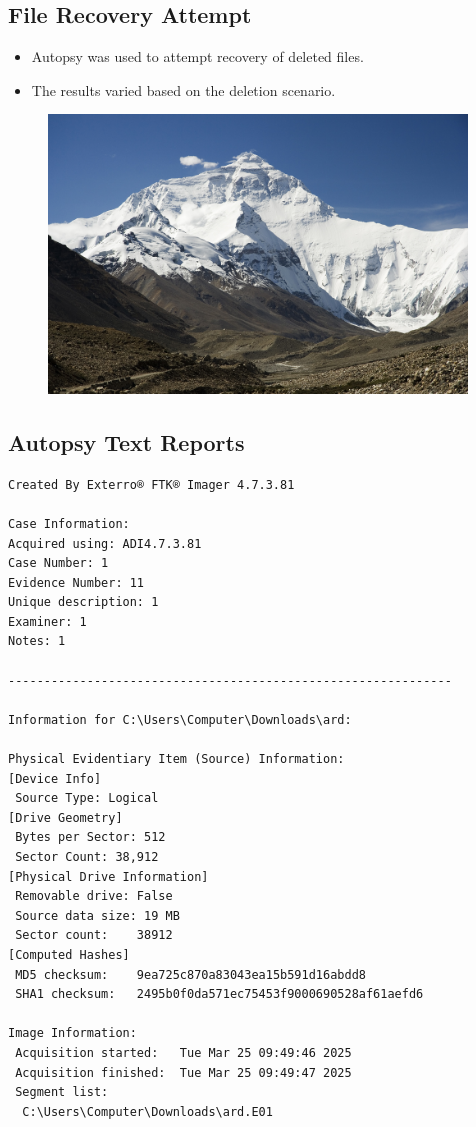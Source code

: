 \documentclass[11pt]{article}
\begin{document}
\subsection{File Recovery Attempt}
\begin{itemize}
    \item Autopsy was used to attempt recovery of deleted files.
    \item The results varied based on the deletion scenario.
\end{itemize}
\begin{figure}[H]
    \centering
    \includegraphics[width=0.99\textwidth]{everest.jpg}
    \caption{}
    \label{fig:1}
\end{figure}

\subsection{Autopsy Text Reports}

\begin{verbatim}
Created By Exterro® FTK® Imager 4.7.3.81 

Case Information: 
Acquired using: ADI4.7.3.81
Case Number: 1
Evidence Number: 11
Unique description: 1
Examiner: 1
Notes: 1

--------------------------------------------------------------

Information for C:\Users\Computer\Downloads\ard:

Physical Evidentiary Item (Source) Information:
[Device Info]
 Source Type: Logical
[Drive Geometry]
 Bytes per Sector: 512
 Sector Count: 38,912
[Physical Drive Information]
 Removable drive: False
 Source data size: 19 MB
 Sector count:    38912
[Computed Hashes]
 MD5 checksum:    9ea725c870a83043ea15b591d16abdd8
 SHA1 checksum:   2495b0f0da571ec75453f9000690528af61aefd6

Image Information:
 Acquisition started:   Tue Mar 25 09:49:46 2025
 Acquisition finished:  Tue Mar 25 09:49:47 2025
 Segment list:
  C:\Users\Computer\Downloads\ard.E01

\end{verbatim}
\end{document}
